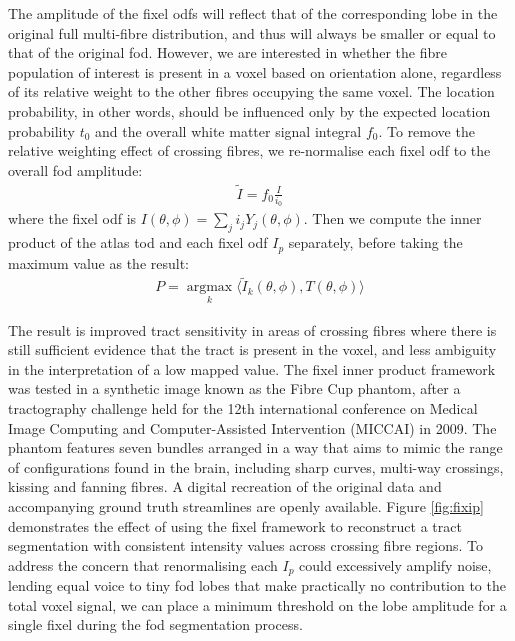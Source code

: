 \documentclass[12pt,phd,a4paper,twoside]{ucl_thesis}
\begin{document}
The amplitude of the fixel \glspl{odf} will reflect that of the corresponding lobe in the original full multi-fibre distribution, and thus will always be smaller or equal to that of the original \gls{fod}.
However, we are interested in whether the fibre population of interest is present in a voxel based on orientation alone, regardless of its relative weight to the other fibres occupying the same voxel.
The location probability, in other words, should be influenced only by the expected location probability $t_0$ and the overall white matter signal integral $f_0$.
To remove the relative weighting effect of crossing fibres, we re-normalise each fixel \gls{odf} to the overall \gls{fod} amplitude:
\begin{align}
  \widetilde{I} = f_0\frac{I}{i_0}
\end{align}
where the fixel \gls{odf} is $I(\theta, \phi) = \sum_j i_j Y_j(\theta,\phi)$.
Then we compute the inner product of the atlas \gls{tod} and each fixel \gls{odf} $I_p$ separately, before taking the maximum value as the result:
\begin{align}
  P = \operatorname*{argmax}_k \langle \widetilde{I}_k(\theta,\phi), T(\theta,\phi) \rangle
\end{align}

The result is improved tract sensitivity in areas of crossing fibres where there is still sufficient evidence that the tract is present in the voxel, and less ambiguity in the interpretation of a low mapped value.
The fixel inner product framework was tested in a synthetic image known as the Fibre Cup phantom, after a tractography challenge held for the 12th international conference on Medical Image Computing and Computer-Assisted Intervention (MICCAI) in 2009\autocite{Fillard2011}.
The phantom features seven bundles arranged in a way that aims to mimic the range of configurations found in the brain, including sharp curves, multi-way crossings, kissing and fanning fibres.
A digital recreation of the original data and accompanying ground truth streamlines are openly available\autocite{NITRC}.
Figure \ref{fig:fixip} demonstrates the effect of using the fixel framework to reconstruct a tract segmentation with consistent intensity values across crossing fibre regions.
To address the concern that renormalising each $I_p$ could excessively amplify noise, lending equal voice to tiny \gls{fod} lobes that make practically no contribution to the total voxel signal, we can place a minimum threshold on the lobe amplitude for a single fixel during the \gls{fod} segmentation process.
\end{document}
